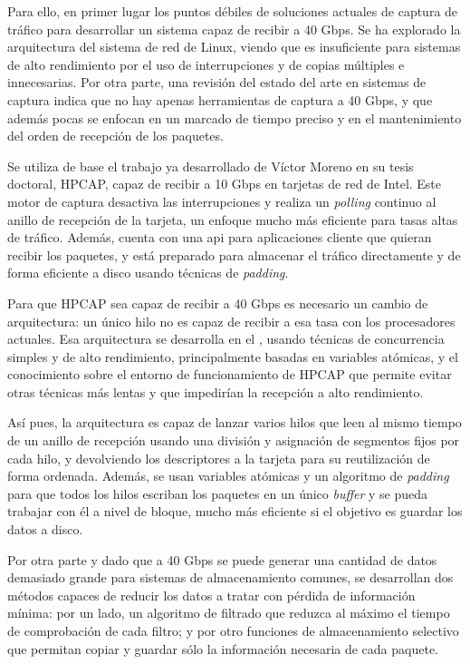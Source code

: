 \documentclass[twoside, 12pt]{epstfg}
\begin{document}
Para ello, en primer lugar los puntos débiles de soluciones actuales de captura de tráfico para desarrollar un sistema capaz de recibir a 40 Gbps. Se ha explorado la arquitectura del sistema de red de Linux, viendo que es insuficiente para sistemas de alto rendimiento por el uso de interrupciones y de copias múltiples e innecesarias. Por otra parte, una revisión del estado del arte en sistemas de captura indica que no hay apenas herramientas de captura a 40 Gbps, y que además pocas se enfocan en un marcado de tiempo preciso y en el mantenimiento del orden de recepción de los paquetes.

Se utiliza de base el trabajo ya desarrollado de Víctor Moreno en su tesis doctoral, HPCAP, capaz de recibir a 10 Gbps en tarjetas de red de Intel. Este motor de captura desactiva las interrupciones y realiza un \textit{polling} continuo al anillo de recepción de la tarjeta, un enfoque mucho más eficiente para tasas altas de tráfico. Además, cuenta con una \gls{api} para aplicaciones cliente que quieran recibir los paquetes, y está preparado para almacenar el tráfico directamente y de forma eficiente a disco usando técnicas de \textit{padding}.

Para que HPCAP sea capaz de recibir a 40 Gbps es necesario un cambio de arquitectura: un único hilo no es capaz de recibir a esa tasa con los procesadores actuales. Esa arquitectura se desarrolla en el , usando técnicas de concurrencia simples y de alto rendimiento, principalmente basadas en variables atómicas, y el conocimiento sobre el entorno de funcionamiento de HPCAP que permite evitar otras técnicas más lentas y que impedirían la recepción a alto rendimiento.

Así pues, la arquitectura es capaz de lanzar varios hilos que leen al mismo tiempo de un anillo de recepción usando una división y asignación de segmentos fijos por cada hilo, y devolviendo los descriptores a la tarjeta para su reutilización de forma ordenada. Además, se usan variables atómicas y un algoritmo de \textit{padding} para que todos los hilos escriban los paquetes en un único \textit{buffer} y se pueda trabajar con él a nivel de bloque, mucho más eficiente si el objetivo es guardar los datos a disco.

Por otra parte y dado que a 40 Gbps se puede generar una cantidad de datos demasiado grande para sistemas de almacenamiento comunes, se desarrollan dos métodos capaces de reducir los datos a tratar con pérdida de información mínima: por un lado, un algoritmo de filtrado que reduzca al máximo el tiempo de comprobación de cada filtro; y por otro funciones de almacenamiento selectivo que permitan copiar y guardar sólo la información necesaria de cada paquete.
\end{document}
